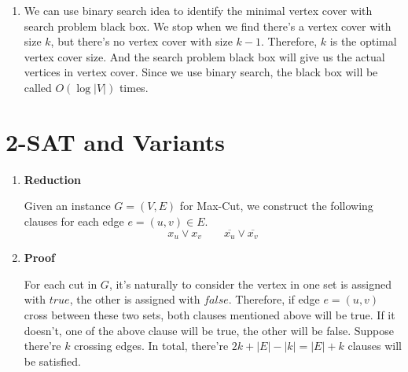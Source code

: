 \documentclass[11pt]{article}
\newenvironment{qparts}{\begin{enumerate}[{(}a{)}]}{\end{enumerate}}
\begin{document}
\begin{qparts}
	Therefore, when the algorithm ends, $S$ will contain a valid vertex cover if solution exists.
	
	\textbf{Time Complexity}
	
	The black box will be called at most $O(|V|)$ times.
	
	\item 
	
	We can use binary search idea to identify the minimal vertex cover with search problem black box. We stop when we find there's a vertex cover with size $k$, but there's no vertex cover with size $k-1$. Therefore, $k$ is the optimal vertex cover size. And the search problem black box will give us the actual vertices in vertex cover. Since we use binary search, the black box will be called $O(\log |V|)$ times.
	
	
\end{qparts}

\newpage
\section{2-SAT and Variants}

\begin{qparts}
	\item 
	
	\textbf{Reduction}
	
	Given an instance $G=(V,E)$ for Max-Cut, we construct the following clauses for each edge $e = (u, v) \in E$.
	\[
		x_u \lor x_v \qquad \overline{x_u} \lor \overline{x_v}
	\]
	
	\item
	
	\textbf{Proof}
	
	For each cut in $G$, it's naturally to consider the vertex in one set is assigned with $true$, the other is assigned with $false$. Therefore, if edge $e = (u, v)$ cross between these two sets, both clauses mentioned above will be true. If it doesn't, one of the above clause will be true, the other will be false.
	Suppose there're $k$ crossing edges. In total, there're $2k + |E| - |k| = |E| + k$ clauses will be satisfied.
	
	

\end{qparts}
\end{document}
